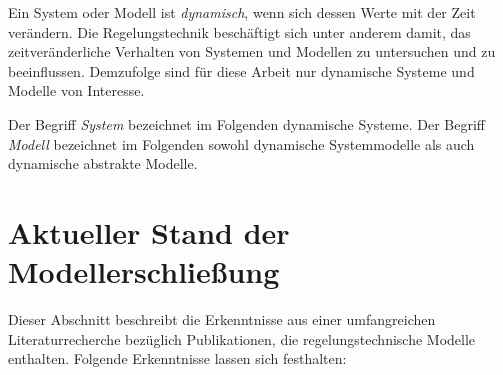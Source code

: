 Ein System oder Modell ist \textit{dynamisch}, wenn sich dessen Werte mit der Zeit verändern. Die Regelungstechnik beschäftigt sich unter anderem damit, das zeitveränderliche Verhalten von Systemen und Modellen zu untersuchen und zu beeinflussen. Demzufolge sind für diese Arbeit nur dynamische Systeme und Modelle von Interesse.

Der Begriff \textit{System} bezeichnet im Folgenden dynamische Systeme. Der Begriff \textit{Modell} bezeichnet im Folgenden sowohl dynamische Systemmodelle als auch dynamische abstrakte Modelle.

\section{Aktueller Stand der Modellerschließung}%
\label{Ch:Vorbetrachtung:Sec:CurrentState}
Dieser Abschnitt beschreibt die Erkenntnisse aus einer umfangreichen Literaturrecherche bezüglich Publikationen, die regelungstechnische Modelle enthalten. Folgende Erkenntnisse lassen sich festhalten:

